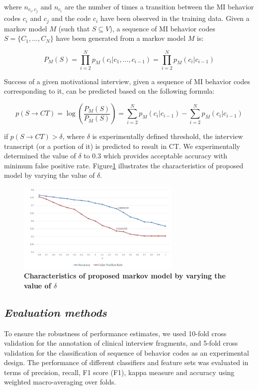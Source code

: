 \documentclass{amia}
\begin{document}
where $n_{c_i,c_j}$ and $n_{c_i}$ are the number of times a transition between the MI behavior codes $c_i$ and $c_j$ and the code $c_i$ have been observed in the training data. Given a markov model $M$ (such that $S\subseteq V$), a sequence of MI behavior codes $S = \{C_1,...,C_N\}$ have been generated from a markov model $M$ is:

\begin{equation}
P_M(S) = \prod_{i=2}^N p_M(c_i|c_1,\dots,c_{i-1})=\prod_{i=2}^N p_M(c_i|c_{i-1})
\end{equation}

Success of a given motivational interview, given a sequence of MI behavior codes corresponding to it, can be predicted based on the following formula:

\begin{equation}
p(S\rightarrow CT) = \log\left(\frac{P_M(S)}{P_{\overline M}(S)}\right)= \sum_{i=2}^N p_M(c_i|c_{i-1})-\sum_{i=2}^N p_{\overline M}(c_i|c_{i-1})
\end{equation}

if $p(S\rightarrow CT) > \delta $, where $\delta$ is experimentally defined threshold, the interview transcript (or a portion of it) is predicted to result in CT. We experimentally determined the value of $\delta$ to 0.3 which provides acceptable accuracy with minimum false positive rate. Figure\ref{fig:delta} illustrates the characteristics of proposed model by varying the value of $\delta$.  

\begin{figure}[htb!]
    \centering
    \includegraphics[width=0.70\textwidth]{figures/deltadata.jpg}
    \caption{\textbf{Characteristics of proposed markov model by varying the value of $\delta$}}
    \label{fig:delta}
\end{figure}

\subsection*{\textit{Evaluation methods}}
To ensure the robustness of performance estimates, we used 10-fold cross validation for the annotation of clinical interview fragments, and 5-fold cross validation for the classification of sequence of behavior codes \citep{36} as an experimental design. The performance of different classifiers and feature sets was evaluated in terms of precision, recall, F1 score (F1), kappa measure and accuracy using weighted macro-averaging over folds.
\end{document}

